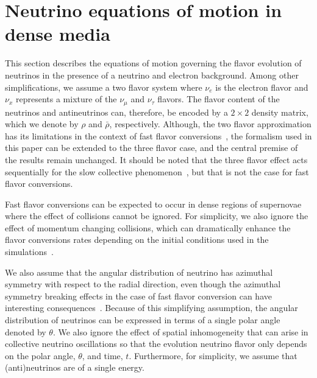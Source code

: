 \documentclass[aps, prd, 10pt, twocolumn, superscriptaddress, noshowpacs, preprintnumbers, longbibliography, groupedaddress, footinbib, bibnotes]{revtex4-1}
\begin{document}

\section{Neutrino equations of motion in dense media}
\label{sec:qke}


This section describes the equations of motion governing the flavor evolution of neutrinos in the presence of a neutrino and electron background. Among other simplifications, we assume a two flavor system where $\nu_{e}$ is the electron flavor and $\nu_{x}$ represents a mixture of the $\nu_{\mu}$ and $\nu_{\tau}$ flavors. 
The flavor content of the neutrinos and antineutrinos can, therefore, be encoded by a $2\times 2$ density matrix, which we denote by $\rho$ and $\bar{\rho}$, respectively. Although, the two flavor approximation has its limitations in the context of fast flavor conversions~\cite{Chakraborty:2019wxe, Capozzi:2020kge, Shalgar:2021wlj}, the formalism used in this paper can be extended to the three flavor case, and the central premise of the results remain unchanged. It should be noted that the three flavor effect acts sequentially for the slow collective phenomenon~\cite{Dasgupta:2010cd, Dasgupta:2010ae, Dasgupta:2007ws, Friedland:2010sc}, but that is not the case for fast flavor conversions.

Fast flavor conversions can be expected to occur in dense regions of supernovae where the effect of collisions cannot be ignored. For simplicity, we also ignore the effect of momentum changing collisions, which can dramatically enhance the flavor conversions rates depending on the initial conditions used in the simulations~\cite{Shalgar:2020wcx}.


We also assume that the angular distribution of neutrino has azimuthal symmetry with respect to the radial direction, even though the azimuthal symmetry breaking effects in the case of fast flavor conversion can have interesting consequences~\cite{Shalgar:2021oko}. Because of this simplifying assumption, the angular distribution of neutrinos can be expressed in terms of a single polar angle denoted by $\theta$. We also ignore the effect of spatial inhomogeneity that can arise in collective neutrino oscillations so that the evolution neutrino flavor only depends on the polar angle, $\theta$, and time, $t$. Furthermore, for simplicity, we assume that (anti)neutrinos are of a single energy. 
\end{document}
